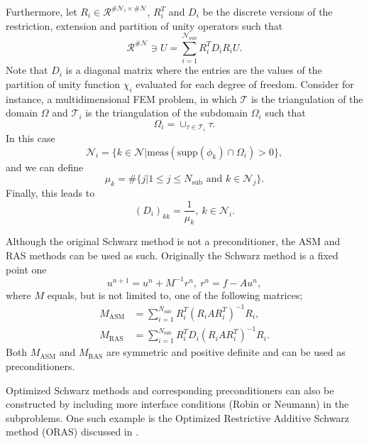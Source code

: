 Furthermore, let $R_i\in\mathcal{R}^{\#\mathcal{N}_i \times \#\mathcal{N}}$, $R_i^T$ and $D_i$ be the discrete versions of the restriction, extension and partition of unity operators such that
\[
    \mathcal{R}^{\#\mathcal{N}}\ni U = \sum_{i=1}^{\mathcal{N}_{\text{sub}}} R_i^T D_i R_i U.
\]
Note that $D_i$ is a diagonal matrix where the entries are the values of the partition of unity function $\chi_i$ evaluated for each degree of freedom. Consider for instance, a multidimensional FEM problem, in which $\mathcal{T}$ is the triangulation of the domain $\Omega$ and $\mathcal{T}_i$ is the triangulation of the subdomain $\Omega_i$ such that \cite[Equation 1.27]{schwarz_methods_Dolean_2015}
\[
    \Omega_i = \cup_{\tau \in \mathcal{T}_i} \tau.
\]
In this case \cite[Equation 1.28]{schwarz_methods_Dolean_2015}
\[
    \mathcal{N}_i = \{k\in\mathcal{N}| \text{meas}(\text{supp}(\phi_k)\cap\Omega_i)>0\},
\]
and we can define
\[
    \mu_k = \#\{j| 1\leq j \leq N_{\text{sub}} \text{ and } k\in\mathcal{N}_j\}.
\]
Finally, this leads to
\begin{equation}
    (D_i)_{kk} = \frac{1}{\mu_k}, \ k \in \mathcal{N}_i.
    \label{eq:schwarz_partition_of_unity_FEM}
\end{equation}

Although the original Schwarz method is not a preconditioner, the ASM and RAS methods can be used as such. Originally the Schwarz method is a fixed point one \cite[Definitions 1.12 and 1.13]{schwarz_methods_Dolean_2015}
\[
    u^{n+1} = u^n + M^{-1}r^n, \ r^n = f - A u^n,
\]
where $M$ equals, but is not limited to, one of the following matrices;
\begin{subequations}
    \begin{align}
        M_{\text{ASM}} & = \sum_{i=1}^{N_{\text{sub}}} R_i^T (R_i A R_i^T)^{-1} R_i, \label{eq:ASM_preconditioner}     \\
        M_{\text{RAS}} & = \sum_{i=1}^{N_{\text{sub}}} R_i^T D_i (R_i A R_i^T)^{-1} R_i \label{eq:RAS_preconditioner}.
    \end{align}
\end{subequations}
Both $M_{\text{ASM}}$ and $M_{\text{RAS}}$ are symmetric and positive definite and can be used as preconditioners.

Optimized Schwarz methods and corresponding preconditioners can also be constructed by including more interface conditions (Robin or Neumann) in the subproblems. One such example is the Optimized Restrictive Additive Schwarz method (ORAS) discussed in \cite[Chapter 2]{schwarz_methods_Dolean_2015}.

